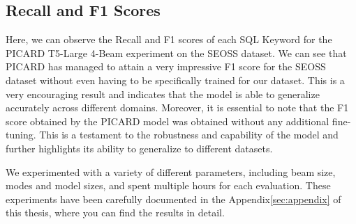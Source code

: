 \subsection{Recall and F1 Scores}

Here, we can observe the Recall and F1 scores of each SQL Keyword for the PICARD T5-Large 4-Beam experiment on the SEOSS dataset. We can see that PICARD has managed to attain a very impressive F1 score for the SEOSS dataset without even having to be specifically trained for our dataset. This is a very encouraging result and indicates that the model is able to generalize accurately across different domains. Moreover, it is essential to note that the F1 score obtained by the PICARD model was obtained without any additional fine-tuning. This is a testament to the robustness and capability of the model and further highlights its ability to generalize to different datasets.

We experimented with a variety of different parameters, including beam size, modes and model sizes, and spent multiple hours for each evaluation. These experiments have been carefully documented in the Appendix\ref{sec:appendix} of this thesis, where you can find the results in detail.



